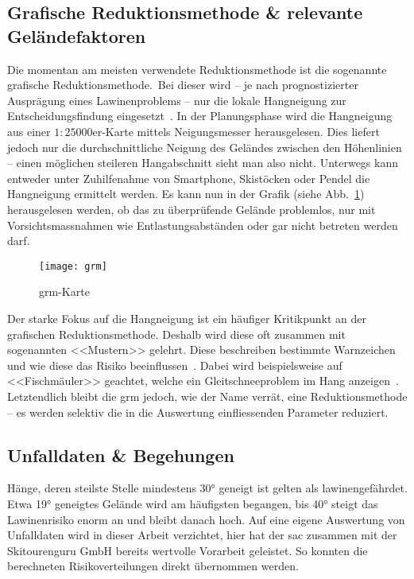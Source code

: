 \pagebreak
\subsection{Grafische Reduktionsmethode \& relevante Geländefaktoren}

Die momentan am meisten verwendete Reduktionsmethode ist die sogenannte grafische Reduktionsmethode.\ Bei dieser wird -- je nach prognostizierter Ausprägung eines Lawinenproblems -- nur die lokale Hangneigung zur Entscheidungsfindung eingesetzt~\cite{sacbergspwinter}. In der Planungsphase wird die Hangneigung aus einer $1:25000$er-Karte mittels Neigungsmesser herausgelesen. Dies liefert jedoch nur die durchschnittliche Neigung des Geländes zwischen den Höhenlinien -- einen möglichen steileren Hangabschnitt sieht man also nicht.
Unterwegs kann entweder unter Zuhilfenahme von Smartphone, Skistöcken oder Pendel die Hangneigung ermittelt werden. Es kann nun in der Grafik (siehe Abb.\ \ref{fig:grm}) herausgelesen werden, ob das zu überprüfende Gelände problemlos, nur mit Vorsichtsmassnahmen wie Entlastungsabständen oder gar nicht betreten werden darf.
\begin{figure}[H]
  \centering
  \texttt{[image: grm]}
  \caption{\gls{grm}-Karte~\cite{achtunglawine}}\label{fig:grm}
\end{figure}

Der starke Fokus auf die Hangneigung ist ein häufiger Kritikpunkt an der grafischen Reduktionsmethode. Deshalb wird diese oft zusammen mit sogenannten <<Mustern>> gelehrt. Diese beschreiben bestimmte Warnzeichen und wie diese das Risiko beeinflussen~\cite{achtunglawine}. Dabei wird beispielsweise auf <<Fischmäuler>> geachtet, welche ein Gleitschneeproblem im Hang anzeigen~\cite{harveyrhynerschweizerlawinenkunde}. Letztendlich bleibt die \gls{grm} jedoch, wie der Name verrät, eine Reduktionsmethode -- es werden selektiv die in die Auswertung einfliessenden Parameter reduziert.

\subsection{Unfalldaten \& Begehungen}

Hänge, deren steilste Stelle mindestens 30° geneigt ist gelten als lawinengefährdet. Etwa 19° geneigtes Gelände wird am häufigsten begangen, bis 40° steigt das Lawinenrisiko enorm an und bleibt danach hoch. Auf eine eigene Auswertung von Unfalldaten wird in dieser Arbeit verzichtet, hier hat der \acrfull{sac} zusammen mit der Skitourenguru GmbH bereits wertvolle Vorarbeit geleistet. So konnten die berechneten Risikoverteilungen direkt übernommen werden.~\cite{sacbergspwinterp99} 


